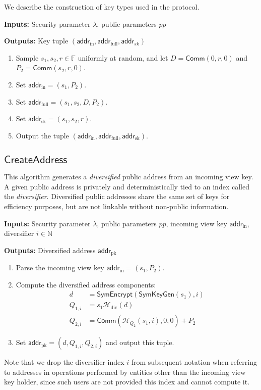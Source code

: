 \documentclass{llncs}
\newcommand{\F}{\mathbb{F}}
\newcommand{\hash}{\mathcal{H}}
\newcommand{\func}[1]{\mathsf{#1}}
\newcommand{\addr}{\func{addr}}
\newcommand{\comm}{\func{Comm}}
\begin{document}
We describe the construction of key types used in the protocol.

\textbf{Inputs:} Security parameter $\lambda$, public parameters $pp$

\textbf{Outputs:} Key tuple $(\addr_{\text{in}}, \addr_{\text{full}}, \addr_{sk})$

\begin{enumerate}
\item Sample $s_1, s_2, r \in \F$ uniformly at random, and let $D = \comm(0, r, 0)$ and $P_2 = \comm(s_2, r, 0)$.
\item Set $\addr_{\text{in}} = (s_1, P_2)$.
\item Set $\addr_{\text{full}} = (s_1, s_2, D, P_2)$.
\item Set $\addr_{\text{sk}} = (s_1, s_2, r)$.
\item Output the tuple $(\addr_{\text{in}}, \addr_{\text{full}}, \addr_{\text{sk}})$.
\end{enumerate}


\subsection{\texorpdfstring{$\func{CreateAddress}$}{CreateAddress}}

This algorithm generates a \textit{diversified} public address from an incoming view key.
A given public address is privately and deterministically tied to an index called the \textit{diversifier}.
Diversified public addresses share the same set of keys for efficiency purposes, but are not linkable without non-public information.

\textbf{Inputs:} Security parameter $\lambda$, public parameters $pp$, incoming view key $\addr_{\text{in}}$, diversifier $i \in \mathbb{N}$

\textbf{Outputs:} Diversified address $\addr_{\text{pk}}$

\begin{enumerate}
\item Parse the incoming view key $\addr_{\text{in}} = (s_1, P_2)$.
\item Compute the diversified address components:
\begin{align*}
d &= \func{SymEncrypt}(\func{SymKeyGen}(s_1),i) \\
Q_{1,i} &= s_1 \hash_{\text{div}}(d) \\
Q_{2,i} &= \comm(\hash_{Q_2}(s_1,i),0,0) + P_2
\end{align*}
\item Set $\addr_{\text{pk}} = (d,Q_{1,i},Q_{2,i})$ and output this tuple.
\end{enumerate}
Note that we drop the diversifier index $i$ from subsequent notation when referring to addresses in operations performed by entities other than the incoming view key holder, since such users are not provided this index and cannot compute it.
\end{document}
